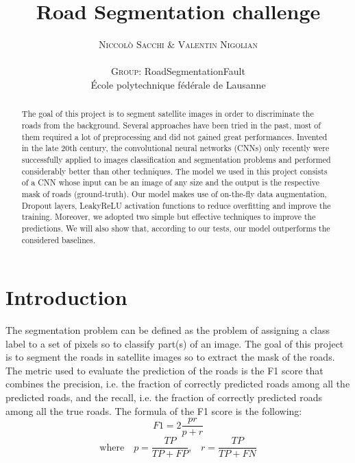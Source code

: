 \documentclass[10pt,conference,compsocconf]{IEEEtran}
\begin{document}
\pretitle{\begin{center}\Huge\bfseries} %
\posttitle{\end{center}} %
\title{Road Segmentation challenge}

\author{
	\textsc{Niccol\`{o} Sacchi \& Valentin Nigolian} \\ 
	\normalsize{} \\
	\textsc{Group:}
	\normalsize{RoadSegmentationFault}\\
	\normalsize \'{E}cole polytechnique f\'{e}d\'{e}rale de Lausanne
}

\maketitle

\begin{abstract}
  The goal of this project is to segment satellite images in order to discriminate the roads from the background. Several approaches have been tried in the past, most of them required a lot of preprocessing and did not gained great performances. Invented in the late 20th century, the convolutional neural networks (CNNs) only recently were successfully applied to images classification and segmentation problems and performed considerably better than other techniques. 
  The model we used in this project consists of a CNN whose input can be an image of any size and the output is the respective mask of roads (ground-truth). Our model makes use of on-the-fly data augmentation, Dropout layers, LeakyReLU activation functions to reduce overfitting and improve the training. Moreover, we adopted two simple but effective techniques to improve the predictions. We will also show that, according to our tests, our model outperforms the considered baselines. 
\end{abstract}

\section{Introduction}
The segmentation problem can be defined as the problem of assigning a class label to a set of pixels so to classify part(s) of an image. 
The goal of this project is to segment the roads in satellite images so to extract the mask of the roads. The metric used to evaluate the prediction of the roads is the F1 score that combines the precision, i.e. the fraction of correctly predicted roads among all the predicted roads, and the recall, i.e. the fraction of correctly predicted roads among all the true roads. The formula of the F1 score is the following:
$$F1=2\frac{pr}{p+r}$$ $$\textrm{where} \quad p=\frac{TP}{TP+FP} \textrm{,} \quad r=\frac{TP}{TP+FN}$$ 
\end{document}
